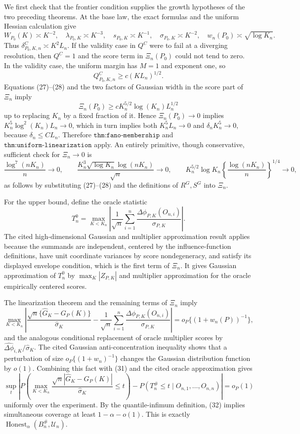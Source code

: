 We first check that the frontier condition supplies the growth hypotheses of the two preceding theorems.  At the base law, the exact formulas and the uniform Hessian calculation give
\[
 W_{P_0}(K)\asymp K^{-2},\quad \lambda_{P_0,K}\asymp K^{-3},\quad
 s_{P_0,K}\asymp K^{-1},\quad \sigma_{P_0,K}\asymp K^{-2},
 \quad w_n(P_0)\asymp\sqrt{\log K_n}. \tag{27}
\]
Thus \(\delta^C_{P_0,K,n}\asymp K^2L_n\).  If the validity case in \(Q^C\) were to fail at a diverging resolution, then \(Q^C=1\) and the score term in \(\Xi_n(P_0)\) could not tend to zero.  In the validity case, the uniform margin has \(M=1\) and exponent one, so
\[
 Q^C_{P_0,K,n}\geq c(KL_n)^{1/2}. \tag{28}
\]
Equations (27)--(28) and the two factors of Gaussian width in the score part of \(\Xi_n\) imply
\[
 \Xi_n(P_0)\geq cK_n^{5/2}\log(K_n)L_n^{1/2} \tag{29}
\]
up to replacing \(K_n\) by a fixed fraction of it.  Hence \(\Xi_n(P_0)\to0\) implies \(K_n^5\log^2(K_n)L_n\to0\), which in turn implies both \(K_n^5L_n\to0\) and \(\delta_nK_n^5\to0\), because \(\delta_n\leq C L_n\).  Therefore \(\texttt{thm:fano-membership}\) and \(\texttt{thm:uniform-linearization}\) apply.  An entirely primitive, though conservative, sufficient check for \(\Xi_n\to0\) is
\[
 \frac{\log^7(nK_n)}n\to0,\qquad
 \frac{K_n^3\sqrt{\log K_n}\log(nK_n)}{\sqrt n}\to0,\qquad
 K_n^{5/2}\log K_n\left\{\frac{\log(nK_n)}n\right\}^{1/4}\to0, \tag{30}
\]
as follows by substituting (27)--(28) and the definitions of \(R^G,S^G\) into \(\Xi_n\).

For the upper bound, define the oracle statistic
\[
 T_n^0=\max_{K<K_n}\left|\frac1{\sqrt n}\sum_{i=1}^n
 \frac{\Delta\phi_{P,K}(O_{n,i})}{\sigma_{P,K}}\right|.
\]
The cited high-dimensional Gaussian and multiplier approximation result applies because the summands are independent, centered by the influence-function definitions, have unit coordinate variances by score nondegeneracy, and satisfy its displayed envelope condition, which is the first term of \(\Xi_n\).  It gives Gaussian approximation of \(T_n^0\) by \(\max_K|Z_{P,K}|\) and multiplier approximation for the oracle empirically centered scores.

The linearization theorem and the remaining terms of \(\Xi_n\) imply
\[
 \max_{K<K_n}\left|\frac{\sqrt n\{\widehat G_K-G_P(K)\}}{\widehat\sigma_K}
 -\frac1{\sqrt n}\sum_{i=1}^n\frac{\Delta\phi_{P,K}(O_{n,i})}{\sigma_{P,K}}\right|
 =o_P\{(1+w_n(P))^{-1}\}, \tag{31}
\]
and the analogous conditional replacement of oracle multiplier scores by \(\widehat{\Delta\phi}_{i,K}/\widehat\sigma_K\).  The cited Gaussian anti-concentration inequality shows that a perturbation of size \(o_P\{(1+w_n)^{-1}\}\) changes the Gaussian distribution function by \(o(1)\).  Combining this fact with (31) and the cited oracle approximation gives
\[
 \sup_t\left|P\left(\max_{K<K_n}\frac{\sqrt n|\widehat G_K-G_P(K)|}{\widehat\sigma_K}\leq t\right)
 -P(T_n^{\#}\leq t\mid O_{n,1},\ldots,O_{n,n})\right|=o_P(1) \tag{32}
\]
uniformly over the experiment.  By the quantile-infimum definition, (32) implies simultaneous coverage at least \(1-\alpha-o(1)\).  This is exactly \(\operatorname{Honest}_{\alpha}(B_n^{\#},\mathcal U_n)\).

